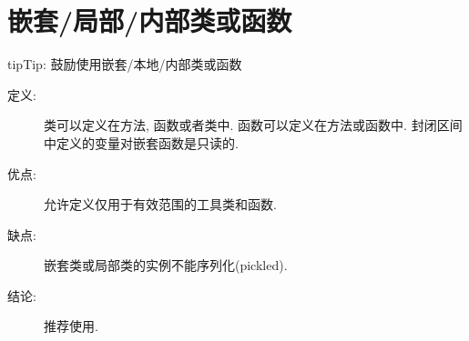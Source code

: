 \documentclass[a4paper,10pt,english]{sphinxmanual}
\begin{document}
\section{嵌套/局部/内部类或函数}
\label{\detokenize{python_language_rules:id5}}
\begin{sphinxadmonition}{tip}{Tip:}
鼓励使用嵌套/本地/内部类或函数
\end{sphinxadmonition}
\begin{description}
\item[{定义:}] \leavevmode
类可以定义在方法, 函数或者类中. 函数可以定义在方法或函数中. 封闭区间中定义的变量对嵌套函数是只读的.

\item[{优点:}] \leavevmode
允许定义仅用于有效范围的工具类和函数.

\item[{缺点:}] \leavevmode
嵌套类或局部类的实例不能序列化(pickled).

\item[{结论:}] \leavevmode
推荐使用.

\end{description}
\end{document}
